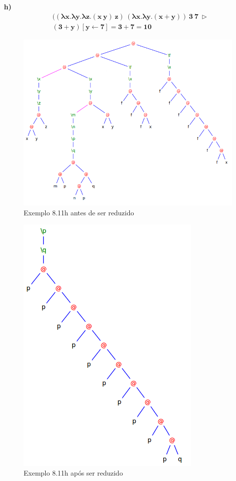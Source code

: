 \documentclass[a4paper]{article}
\begin{document}
\FloatBarrier

\textbf{h)}
\begin{align*}
&\mathbf{((\lambda x.\lambda y.\lambda z.(x\ y)\ z)\ (\lambda x.\lambda y.(x + y))\ 3\ 7\ \rhd} \\
&\mathbf{(3 + y) [y \leftarrow 7] = 3 + 7 = 10}
\end{align*}

\begin{figure}[h]
  \centering
  \includegraphics[scale=0.4]{8-11h_1.png}
  \caption{Exemplo 8.11h antes de ser reduzido}
\end{figure}

\begin{figure}[h]
  \centering
  \includegraphics[scale=0.4]{8-11h_2.png}
  \caption{Exemplo 8.11h após  ser reduzido}
\end{figure}

\FloatBarrier
\end{document}
